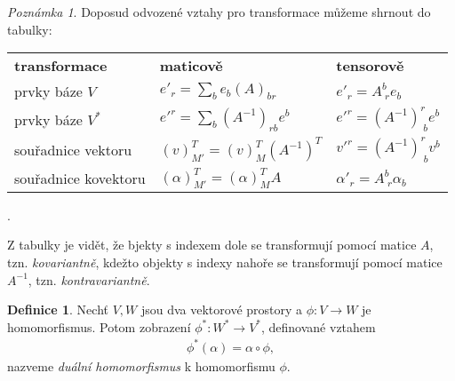 \documentclass[a4paper,11pt]{report}
\theoremstyle{theorem}
\theoremstyle{remark}
\newtheorem*{remark}{Poznámka}
\theoremstyle{definition}
\newtheorem{definition}{Definice}[section]
\begin{document}
			\begin{remark}
				Doposud odvozené vztahy pro transformace můžeme shrnout do tabulky:
				\begin{center}
					\begin{tabular}{m{4cm} m{4cm} m{4cm}}
						\textbf{transformace} & \textbf{maticově} & \textbf{tensorově} \\
						prvky báze $V$ & $e'_r = \sum_b e_b (A)_{br}$ & $e'_r = A^b_{\; r} e_b$ \\
						prvky báze $V^*$ & $e'^r = \sum_b (A^{-1})_{rb} e^b$ & $e'^r = (A^{-1})^r_{\; b} e^b$ \\
						souřadnice vektoru & $(v)^T_{M'} = (v)^T_M (A^{-1})^T$ & $v'^r = (A^{-1})^r_{\; b} v^b$ \\
						souřadnice kovektoru & $(\alpha)^T_{M'} = (\alpha)^T_M A$ & $\alpha'_r = A^b_{\; r} \alpha_b$
					\end{tabular}.
				\end{center}
				Z tabulky je vidět, že bjekty s indexem dole se transformují pomocí matice $A$, tzn. \textit{kovariantně}, kdežto objekty s indexy nahoře se transformují pomocí matice $A^{-1}$, tzn. \textit{kontravariantně}.
			\end{remark}
			
			\begin{definition}
				Nechť $V, W$ jsou dva vektorové prostory a $\phi: V \to W$ je homomorfismus. Potom zobrazení $\phi^*: W^* \to V^*$, definované vztahem
				\begin{align}
					\phi^*(\alpha) = \alpha \circ \phi,
				\end{align}
				nazveme \textit{duální homomorfismus} k homomorfismu $\phi$.
			\end{definition}
			
\end{document}
